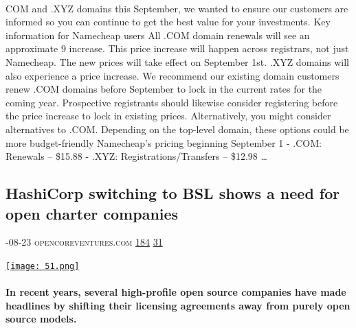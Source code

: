 \documentclass[10pt,a4paper]{article}
\begin{document}
\begin{multicols}{2}
\paragraph{}
COM and .XYZ domains this September, we wanted to ensure our customers are informed so you can continue to get the best value for your investments.
Key information for Namecheap users
All .COM domain renewals will see an approximate 9 increase. This price increase will happen across registrars, not just Namecheap. The new prices will take effect on September 1st. .XYZ domains will also experience a price increase.
We recommend our existing domain customers renew .COM domains before September to lock in the current rates for the coming year. Prospective registrants should likewise consider registering before the price increase to lock in existing prices.
Alternatively, you might consider alternatives to .COM. Depending on the top-level domain, these options could be more budget-friendly
Namecheap’s pricing beginning September 1
- .COM: Renewals – \$15.88
- .XYZ: Registrations/Transfers – \$12.98
\dots\par
\noindent\begin{minipage}{\linewidth}
\medskip
\subsection{HashiCorp switching to BSL shows a need for open charter companies}
\textsc{\footnotesize
{\scriptsize\faCalendar}-08-23 
{\scriptsize\faGlobe}\space 
opencoreventures.com 
{\scriptsize\faThumbsOUp}\space 
\href{http://news.ycombinator.com/item?id=37239979\&utm\_term=comment}{184} 
{\scriptsize\faComments}\space 
\href{http://news.ycombinator.com/item?id=37239979\&utm\_term=comment}{31} 
}
\par\medskip\noindent
\href{https://opencoreventures.com/blog/2023-08-23-hashicorp-switching-bsl-shows-need-for-open-charter-companies/?utm\_source=hackernewsletter\&utm\_medium=email\&utm\_term=startup\_news}{
    \texttt{[image: 51.png]}
}
\end{minipage}
\paragraph{}
\textbf{In recent years, several high-profile open source companies have made headlines by shifting their licensing agreements away from purely open source models.}

\end{multicols}
\end{document}
